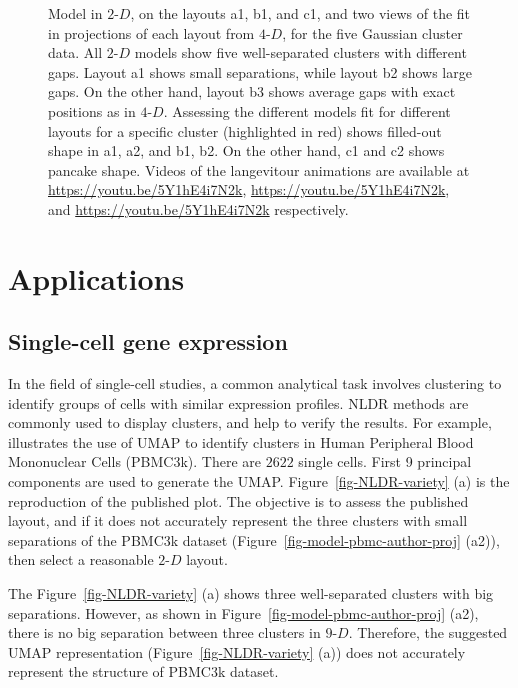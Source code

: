 \documentclass[
  12pt]{article}
\newcommand\gD{$2\text{-}D$}
\begin{document}
\begin{figure}[H]


\caption{\label{fig-five-gau-projs}Model in \gD{}, on the layouts a1,
b1, and c1, and two views of the fit in projections of each layout from
\(4\text{-}D\), for the five Gaussian cluster data. All \gD{} models
show five well-separated clusters with different gaps. Layout a1 shows
small separations, while layout b2 shows large gaps. On the other hand,
layout b3 shows average gaps with exact positions as in \(4\text{-}D\).
Assessing the different models fit for different layouts for a specific
cluster (highlighted in red) shows filled-out shape in a1, a2, and b1,
b2. On the other hand, c1 and c2 shows pancake shape. Videos of the
langevitour animations are available at
\url{https://youtu.be/5Y1hE4i7N2k}, \url{https://youtu.be/5Y1hE4i7N2k},
and \url{https://youtu.be/5Y1hE4i7N2k} respectively.}

\end{figure}%

\section{Applications}\label{sec-applications}

\subsection{Single-cell gene
expression}\label{single-cell-gene-expression}

In the field of single-cell studies, a common analytical task involves
clustering to identify groups of cells with similar expression profiles.
NLDR methods are commonly used to display clusters, and help to verify
the results. For example, \citet{chen2023} illustrates the use of UMAP
to identify clusters in Human Peripheral Blood Mononuclear Cells
(PBMC3k). There are \(2622\) single cells. First 9 principal components
are used to generate the UMAP. Figure~\ref{fig-NLDR-variety} (a) is the
reproduction of the published plot. The objective is to assess the
published layout, and if it does not accurately represent the three
clusters with small separations of the PBMC3k dataset
(Figure~\ref{fig-model-pbmc-author-proj} (a2)), then select a reasonable
\gD{} layout.

The Figure~\ref{fig-NLDR-variety} (a) shows three well-separated
clusters with big separations. However, as shown in
Figure~\ref{fig-model-pbmc-author-proj} (a2), there is no big separation
between three clusters in \(9\text{-}D\). Therefore, the suggested UMAP
representation (Figure~\ref{fig-NLDR-variety} (a)) does not accurately
represent the structure of PBMC3k dataset.
\end{document}
